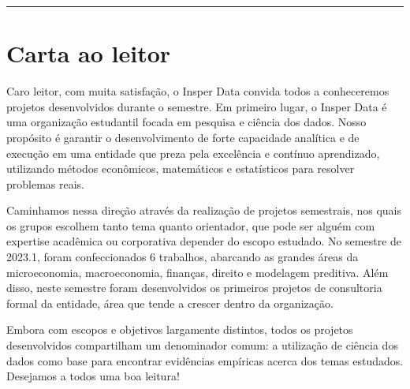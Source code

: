 \documentclass[
    10pt, 
    a4paper, 
    ]{article}
\begin{document}


\tableofcontents

\bigskip\bigskip

\noindent\rule{\linewidth}{.5pt}
\section*{Carta ao leitor}

Caro leitor,
com muita satisfação, o Insper Data convida todos a conheceremos projetos desenvolvidos durante o semestre.
Em primeiro lugar, o Insper Data é uma organização estudantil focada em pesquisa e ciência dos dados. Nosso propósito é garantir o desenvolvimento de forte capacidade analítica e de execução em uma entidade que preza pela excelência e contínuo aprendizado, utilizando métodos econômicos, matemáticos e estatísticos para resolver problemas reais.

Caminhamos nessa direção através da realização de projetos semestrais, nos quais os grupos escolhem tanto tema quanto orientador, que pode ser alguém com expertise acadêmica ou corporativa depender do escopo estudado. No semestre de 2023.1, foram confeccionados 6 trabalhos, abarcando as grandes áreas da microeconomia, macroeconomia, finanças, direito e modelagem preditiva. Além disso, neste semestre foram desenvolvidos os primeiros projetos de consultoria formal da entidade, área que tende a crescer dentro da organização. 

Embora com escopos e objetivos largamente distintos, todos os projetos desenvolvidos compartilham um denominador comum: a utilização de ciência dos dados como base para encontrar evidências empíricas acerca dos temas estudados. Desejamos a todos uma boa leitura!













\clearpage

\nocite{*}


\end{document}

